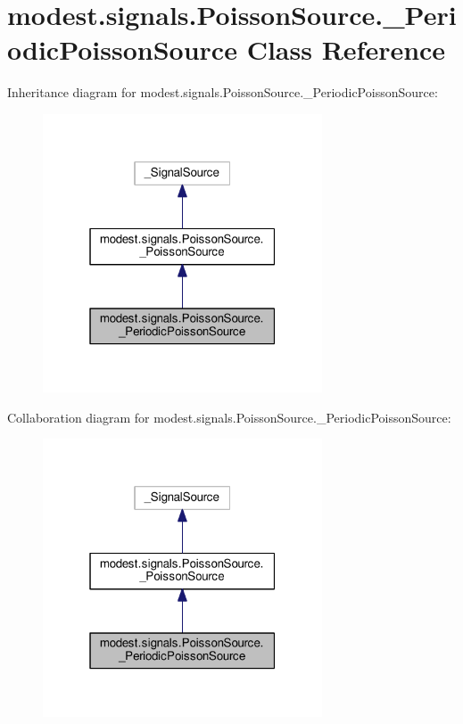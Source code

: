 \hypertarget{classmodest_1_1signals_1_1PoissonSource_1_1__PeriodicPoissonSource}{}\section{modest.\+signals.\+Poisson\+Source.\+\_\+\+Periodic\+Poisson\+Source Class Reference}
\label{classmodest_1_1signals_1_1PoissonSource_1_1__PeriodicPoissonSource}


Inheritance diagram for modest.\+signals.\+Poisson\+Source.\+\_\+\+Periodic\+Poisson\+Source\+:
\nopagebreak
\begin{figure}[H]
\begin{center}
\leavevmode
\includegraphics[width=235pt]{classmodest_1_1signals_1_1PoissonSource_1_1__PeriodicPoissonSource__inherit__graph}
\end{center}
\end{figure}


Collaboration diagram for modest.\+signals.\+Poisson\+Source.\+\_\+\+Periodic\+Poisson\+Source\+:
\nopagebreak
\begin{figure}[H]
\begin{center}
\leavevmode
\includegraphics[width=235pt]{classmodest_1_1signals_1_1PoissonSource_1_1__PeriodicPoissonSource__coll__graph}
\end{center}
\end{figure}
